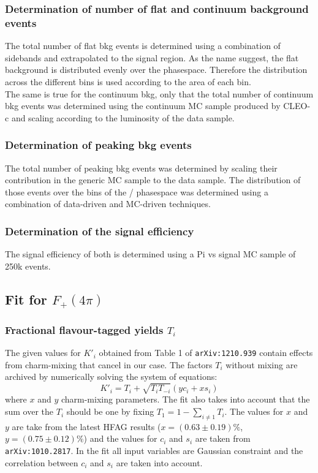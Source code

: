 \subsubsection{Determination of number of flat and continuum background events}
\label{sec:flat}
The total number of flat bkg events is determined using a combination of sidebands and extrapolated to the signal region. As the name suggest, the flat background is distributed evenly over the \KsPiPi phasespace. Therefore the distribution across the different \KsPiPi bins is used according to the area of each bin.\\
The same is true for the continuum bkg, only that the total number of continuum bkg events was determined using the continuum MC sample produced by CLEO-c and scaling according to the luminosity of the data sample.\\

\subsubsection{Determination of peaking bkg events}
The total number of peaking bkg events was determined by scaling their contribution in the generic MC sample to the data sample. The distribution of those events over the bins of the \KsPiPi / \KlPiPi phasespace was determined using a combination of data-driven and MC-driven techniques.\\
  
\subsubsection{Determination of the signal efficiency}
The signal efficiency of both is determined using a \4Pi vs \KsPiPi signal MC sample of 250k events.\\


\subsection{Fit for $F_+(4\pi)$}
\subsubsection{Fractional flavour-tagged \KsPiPi yields $T_i$}
The given values for $K'_i$ obtained from Table 1 of \texttt{arXiv:1210.939} contain effects from charm-mixing that cancel in our case. The factors $T_i$ without mixing are archived by numerically solving the system of equations:
\begin{equation}
K'_i = T_i + \sqrt{T_i T_{-i}} (y c_i + x s_i)
\end{equation}
where $x$ and $y$ charm-mixing parameters. The fit also takes into account that the sum over the $T_i$ should be one by fixing  $T_1 = 1 - \sum_{i \neq 1} T_i$. The values for $x$ and $y$ are take from the latest HFAG results ($x = (0.63 \pm 0.19)\%$, $y = (0.75 \pm 0.12)\% $) and the values for $c_i$ and $s_i$ are taken from \texttt{arXiv:1010.2817}. In the fit all input variables are Gaussian constraint and the correlation between $c_i$ and $s_i$ are taken into account.\\


